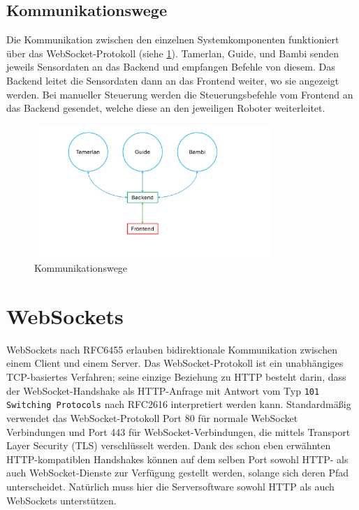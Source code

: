 \subsection{Kommunikationswege}
\label{subsec:ueberblick_comms}
Die Kommunikation zwischen den einzelnen Systemkomponenten
funktioniert über das WebSocket-Protokoll (siehe \ref{sec:websockets}).
%
Tamerlan, Guide, und Bambi senden jeweils
Sensordaten an das Backend und empfangen Befehle von diesem.
%
Das Backend leitet die Sensordaten dann an das Frontend weiter,
wo sie angezeigt werden.
%
Bei manueller Steuerung werden die Steuerungsbefehle vom Frontend an das Backend gesendet,
welche diese an den jeweiligen Roboter weiterleitet. 
\begin{figure}[H]
    \centering
        \includegraphics[width=0.8\textwidth, center, trim={135 90 215 20}, clip]{img/Kommunikationswege.png}  
    \caption{Kommunikationswege}
    \label{fig:kommunikationswege}
\end{figure}

\section{WebSockets}
\label{sec:websockets}
WebSockets nach RFC6455 \cite{rfc6455} erlauben bidirektionale Kommunikation zwischen einem Client und einem Server.
%
Das WebSocket-Protokoll ist ein unabhängiges TCP-basiertes Verfahren;
seine einzige Beziehung zu HTTP besteht darin,
dass der WebSocket-Handshake als HTTP-Anfrage mit Antwort vom Typ
\texttt{101 Switching Protocols} nach RFC2616 \cite{rfc2616} interpretiert werden kann.
%
Standardmäßig verwendet das WebSocket-Protokoll Port 80 für normale WebSocket
Verbindungen und Port 443 für WebSocket-Verbindungen,
die mittels Transport Layer Security (TLS) verschlüsselt werden.
%
Dank des schon eben erwähnten HTTP-kompatiblen Handshakes
können auf dem selben Port sowohl HTTP- als auch WebSocket-Dienste zur Verfügung gestellt werden,
solange sich deren Pfad unterscheidet.
%
Natürlich muss hier die Serversoftware sowohl HTTP als auch WebSockets unterstützen.

